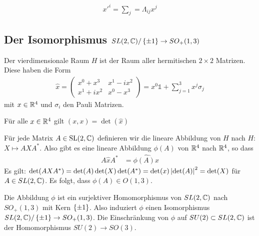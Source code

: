 \begin{align*}
    x'^{i} = \sum_j = \Lambda_{ij} x^j
\end{align*}

\subsection{Der Isomorphismus $SL(2,\mathbb{C}) / \left\{ \pm 1 \right\} \rightarrow SO_+ (1,3)$}

\begin{definition}[$H$]
    Der vierdimensionale Raum $H$ ist der Raum aller hermitischen
    $2 \times 2$ Matrizen. Diese haben die Form
    \begin{align*}
        \hat{x} = \begin{pmatrix}
            x^0 + x^3 & x^1 - i x^2 \\
            x^1 + i x^2 & x^0 - x^3
        \end{pmatrix}
        = x^0 \mathds{1} + \sum_{j=1}^3 x^j \sigma_j
    \end{align*}
    mit $x \in \mathbb{R}^4$ und $\sigma_i$ den Pauli Matrizen.
\end{definition}

\begin{lemma}
    Für alle $x \in \mathbb{R}^4$ gilt $(x,x) = \det(\hat{x})$
\end{lemma}

\begin{satz}
    Für jede Matrix $A \in \text{SL}(2,\mathbb{C})$ definieren wir die lineare Abbildung
    von $H$ nach $H$: $X \mapsto A X A^\ast$. Also gibt es eine lineare Abbildung
    $\phi(A)$ von $\mathbb{R}^4$ nach $\mathbb{R}^4$, so dass
    \begin{align*}
        A \hat{x} A^\ast &= \widehat{\phi(A) x}
    \end{align*}
    Es gilt: $\det(A X A^\ast) = \det(A) \det(X) \det(A^\ast) = \det(x)
    \left\vert \det(A) \right\vert^2 = \det(X)$ für $A \in SL(2,\mathbb{C})$. Es folgt, dass
    $\phi(A) \in O(1,3)$.
\end{satz}

\begin{satz}
    Die Abbildung $\phi$ ist ein surjektiver Homomorphismus von $SL(2,\mathbb{C})$
    nach $SO_+ (1,3)$ mit Kern $\left\{ \pm 1 \right\}$. Also induziert
    $\phi$ einen Isomorphismus $SL(2,\mathbb{C}) / \left\{ \pm 1 \right\}
    \rightarrow SO_+ (1,3)$. Die Einschränkung von $\phi$ auf $SU(2) \subset
    SL(2,\mathbb{C})$ ist der Homomorphismus $SU(2) \rightarrow SO(3)$.
\end{satz}
